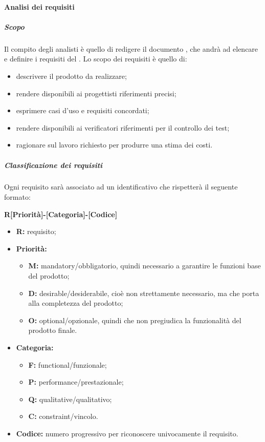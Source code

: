 		\paragraph{Analisi dei requisiti}
			\subparagraph{Scopo}
			Il compito degli analisti è quello di redigere il documento , che andrà ad elencare e definire i requisiti del . Lo scopo dei requisiti è quello di:
			\begin{itemize}
				\item descrivere il prodotto da realizzare;
				\item rendere disponibili ai progettisti riferimenti precisi;
				\item esprimere casi d'uso e requisiti concordati;
				\item rendere disponibili ai verificatori riferimenti per il controllo dei test;
				\item ragionare sul lavoro richiesto per produrre una stima dei costi.
			\end{itemize}
			\subparagraph{Classificazione dei requisiti}
			Ogni requisito sarà associato ad un identificativo che rispetterà il seguente formato:
			\begin{center}
				\textbf{R[Priorità]-[Categoria]-[Codice]}
			\end{center}
			\begin{itemize}
				\item \textbf{R:} requisito;
				\item \textbf{Priorità:}
				\begin{itemize}
					\item \textbf{M:} mandatory/obbligatorio, quindi necessario a garantire le funzioni base del prodotto;
					\item \textbf{D:} desirable/desiderabile, cioè non strettamente necessario, ma che porta alla completezza del prodotto;
					\item \textbf{O:} optional/opzionale, quindi che non pregiudica la funzionalità del prodotto finale.
				\end{itemize}
				\item \textbf{Categoria:}
				\begin{itemize}
					\item \textbf{F:} functional/funzionale;
					\item \textbf{P:} performance/prestazionale;
					\item \textbf{Q:} qualitative/qualitativo;
					\item \textbf{C:} constraint/vincolo.
				\end{itemize}
				\item \textbf{Codice:} numero progressivo per riconoscere univocamente il requisito.
			\end{itemize}

